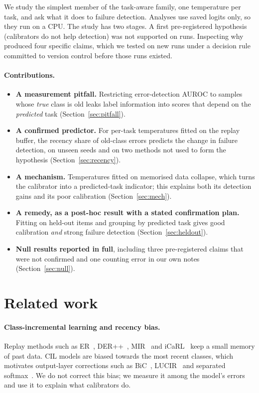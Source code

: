 \documentclass[11pt]{article}
\begin{document}
We study the simplest member of the task-aware family, one temperature per task, and ask what it
does to failure detection. Analyses use saved logits only, so they run on a CPU. The study has two
stages. A first pre-registered hypothesis (calibrators do not help detection) was not supported
on \nExplore{} runs. Inspecting why produced four specific claims, which we tested on \nConfirm{}
new runs under a decision rule committed to version control before those runs existed.

\paragraph{Contributions.}
\begin{itemize}
\item \textbf{A measurement pitfall.} Restricting error-detection AUROC to samples whose \emph{true}
  class is old leaks label information into scores that depend on the \emph{predicted} task
  (Section~\ref{sec:pitfall}).
\item \textbf{A confirmed predictor.} For per-task temperatures fitted on the replay buffer, the
  recency share of old-class errors predicts the change in failure detection, on unseen seeds and
  on two methods not used to form the hypothesis (Section~\ref{sec:recency}).
\item \textbf{A mechanism.} Temperatures fitted on memorised data collapse, which turns the
  calibrator into a predicted-task indicator; this explains both its detection gains and its poor
  calibration (Section~\ref{sec:mech}).
\item \textbf{A remedy, as a post-hoc result with a stated confirmation plan.} Fitting on held-out
  items and grouping by predicted task gives good calibration \emph{and} strong failure detection
  (Section~\ref{sec:heldout}).
\item \textbf{Null results reported in full}, including three pre-registered claims that were not
  confirmed and one counting error in our own notes (Section~\ref{sec:null}).
\end{itemize}

\section{Related work}
\paragraph{Class-incremental learning and recency bias.} Replay methods such as
ER~\cite{chaudhry2019tiny}, DER++~\cite{buzzega2020dark}, MIR~\cite{aljundi2019mir} and
iCaRL~\cite{rebuffi2017icarl} keep a small memory of past data. CIL models are biased towards the
most recent classes, which motivates output-layer corrections such as BiC~\cite{wu2019bic},
LUCIR~\cite{hou2019lucir} and separated softmax~\cite{ahn2021ssil}. We do not correct this bias; we
measure it among the model's errors and use it to explain what calibrators do.
\end{document}
